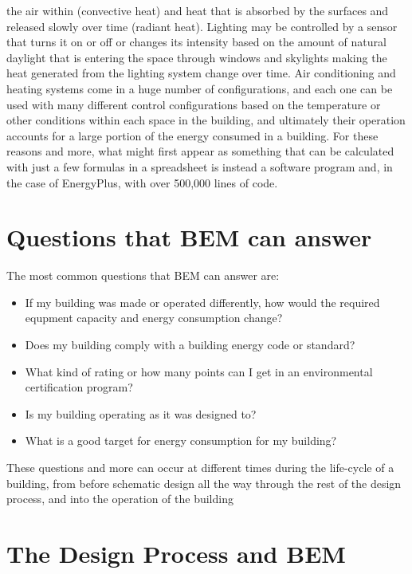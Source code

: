 the air within (convective heat) and heat that is absorbed by the
surfaces and released slowly over time (radiant heat). Lighting may
be controlled by a sensor that turns it on or off or changes its intensity
based on the amount of natural daylight that is entering the space
through windows and skylights making the heat generated from the lighting
system change over time. Air conditioning and heating systems come
in a huge number of configurations, and each one can be used with
many different control configurations based on the temperature or
other conditions within each space in the building, and ultimately
their operation accounts for a large portion of the energy consumed
in a building. For these reasons and more, what might first appear
as something that can be calculated with just a few formulas in a
spreadsheet is instead a software program and, in the case of EnergyPlus,
with over 500,000 lines of code.

\section{Questions that BEM can answer}

The most common questions that BEM can answer are:
\begin{itemize}
\item If my building was made or operated differently, how would the required
equpment capacity and energy consumption change?
\item Does my building comply with a building energy code or standard?
\item What kind of rating or how many points can I get in an environmental
certification program?
\item Is my building operating as it was designed to?
\item What is a good target for energy consumption for my building?
\end{itemize}
These questions and more can occur at different times during the life-cycle
of a building, from before schematic design all the way through the
rest of the design process, and into the operation of the building

\section{The Design Process and BEM }

